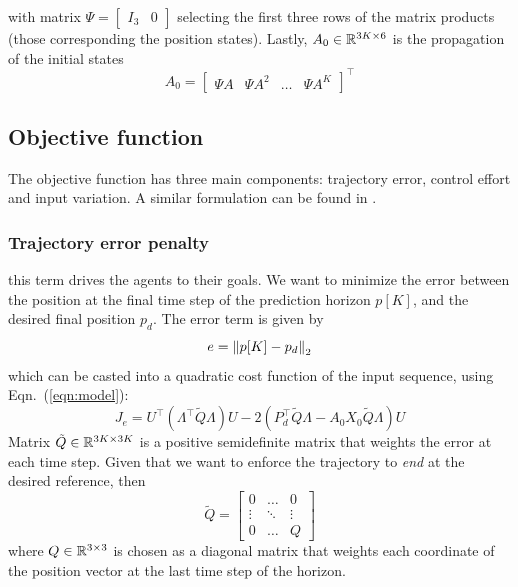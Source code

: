 with matrix $\Psi = \begin{bmatrix}
I_3 & 0
\end{bmatrix}$ selecting the first three rows of the matrix products (those corresponding the position states). 
Lastly, $A_0 \in {\mathbb R}^{3K \times 6}$ is the propagation of the initial states
\begin{equation}
A_0 = \begin{bmatrix}
\Psi A & \Psi A^2 & \ldots & \Psi A^K
\end{bmatrix}^\top
\end{equation}

\subsection{Objective function}
The objective function has three main components: trajectory error, control effort and input variation. A similar formulation can be found in \cite{ru2017nonlinear}.

\subsubsection{Trajectory error penalty}
this term drives the agents to their goals. We want to minimize the error between the position at the final time step of the prediction horizon $p[K]$, and the desired final position $p_d$. The error term is given by
\begin{equation}
e = \left\Vert p[K]-p_d\right\Vert_2
\end{equation}
which can be casted into a quadratic cost function of the input sequence, using Eqn.~(\ref{eqn:model}):
\begin{equation}
\label{eqn:error}
J_e = U^\top(\Lambda^{\top} \tilde{Q} \Lambda)U - 2(P_d^\top \tilde{Q} \Lambda -  A_0X_0 \tilde{Q} \Lambda)U
\end{equation}
Matrix $\tilde{Q} \in {\mathbb R}^{3K \times 3K} $ is a positive semidefinite matrix that weights the error at each time step. Given that we want to enforce the trajectory to \textit{end} at the desired reference, then
\begin{equation}
\tilde{Q} = \begin{bmatrix}
0 & \ldots & 0 \\
\vdots & \ddots & \vdots \\
0 & \ldots & Q
\end{bmatrix}
\end{equation}
where $Q \in {\mathbb R}^{3 \times 3}$ is chosen as a diagonal matrix that weights each coordinate of the position vector at the last time step of the horizon.

